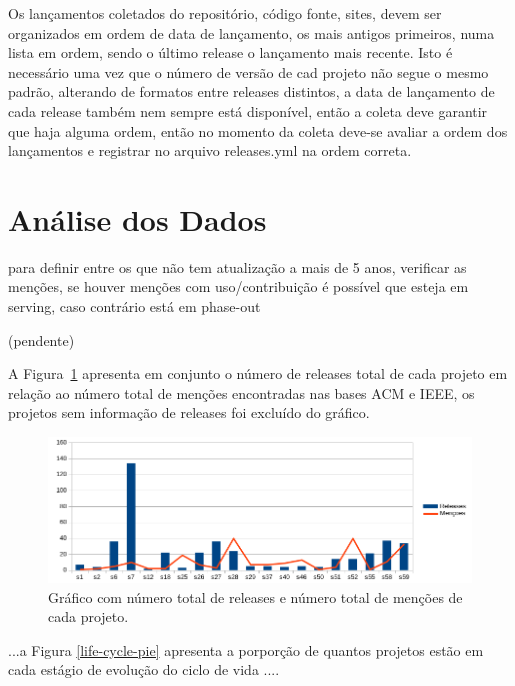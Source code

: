 

Os lançamentos coletados do repositório, código fonte, sites, devem ser organizados
em ordem de data de lançamento, os mais antigos primeiros, numa lista em ordem, sendo
o último release o lançamento mais recente. Isto é necessário uma vez que o número de versão
de cad projeto não segue o mesmo padrão, alterando de formatos entre releases distintos,
a data de lançamento de cada release também nem sempre está disponível, então
a coleta deve garantir que haja alguma ordem, então no momento da coleta deve-se
avaliar a ordem dos lançamentos e registrar no arquivo releases.yml na ordem correta.

\section{Análise dos Dados} \label{estudo3:analise}

para definir entre os que não tem atualização a mais de 5 anos, verificar as
menções, se houver menções com uso/contribuição é possível que esteja em serving,
caso contrário está em phase-out

(pendente)

A Figura~\ref{releases-vs-mentions} apresenta em conjunto o número de releases total
de cada projeto em relação ao número total de menções encontradas nas bases ACM e IEEE,
os projetos sem informação de releases foi excluído do gráfico.

\begin{figure}[h]
  \centering
 \includegraphics[scale=0.6]{imagens/releases-vs-mentions.png}
  \caption{Gráfico com número total de releases e número total de menções de cada projeto.}
  \label{releases-vs-mentions}
\end{figure}

...a Figura \ref{life-cycle-pie} apresenta a porporção de quantos projetos estão em
cada estágio de evolução do ciclo de vida ....



